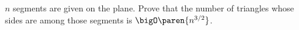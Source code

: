 $n$ segments are given on the plane.
Prove that the number of triangles whose sides are among those segments
is $\bigO\paren{n^{3/2}}$.
